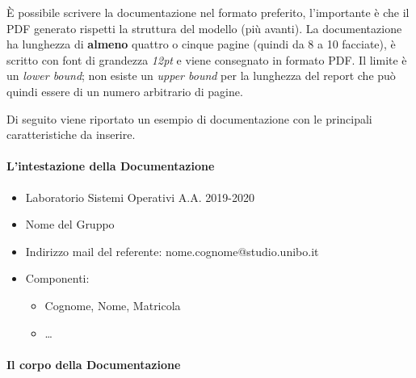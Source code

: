 \documentclass[
]{article}
\providecommand{\tightlist}{%
  \setlength{\itemsep}{0pt}\setlength{\parskip}{0pt}}
\begin{document}
È possibile scrivere la documentazione nel formato preferito,
l'importante è che il PDF generato rispetti la struttura del modello
(più avanti). La documentazione ha lunghezza di \textbf{almeno} quattro
o cinque pagine (quindi da 8 a 10 facciate), è scritto con font di
grandezza \emph{12pt} e viene consegnato in formato PDF. Il limite è un
\emph{lower bound}; non esiste un \emph{upper bound} per la lunghezza
del report che può quindi essere di un numero arbitrario di pagine.

Di seguito viene riportato un esempio di documentazione con le
principali caratteristiche da inserire.

\hypertarget{lintestazione-della-documentazione}{%
\paragraph{L'intestazione della
Documentazione}\label{lintestazione-della-documentazione}}

\begin{itemize}
\tightlist
\item
  Laboratorio Sistemi Operativi A.A. 2019-2020
\item
  Nome del Gruppo
\item
  Indirizzo mail del referente: nome.cognome@studio.unibo.it
\item
  Componenti:

  \begin{itemize}
  \tightlist
  \item
    Cognome, Nome, Matricola
  \item
    \ldots{}
  \end{itemize}
\end{itemize}

\hypertarget{il-corpo-della-documentazione}{%
\paragraph{Il corpo della
Documentazione}\label{il-corpo-della-documentazione}}
\end{document}
